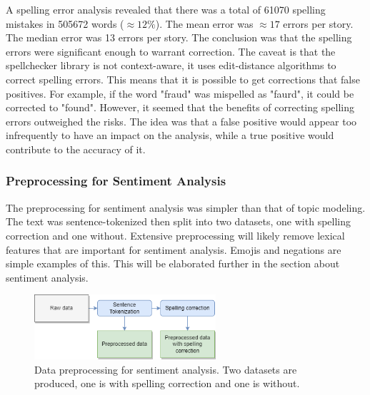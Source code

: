 A spelling error analysis revealed that there was a total of 61070 spelling mistakes in 505672 words ($\approx 12\%$). The mean error was $\approx17$ errors per story. The median error was 13 errors per story. The conclusion was that the spelling errors were significant enough to warrant correction. The caveat is that the spellchecker library is not context-aware, it uses edit-distance algorithms to correct spelling errors. This means that it is possible to get corrections that false positives. For example, if the word "fraud" was mispelled as "faurd", it could be corrected to "found". However, it seemed that the benefits of correcting spelling errors outweighed the risks. The idea was that a false positive would appear too infrequently to have an impact on the analysis, while a true positive would contribute to the accuracy of it.

\subsubsection*{Preprocessing for Sentiment Analysis}

The preprocessing for sentiment analysis was simpler than that of topic modeling. The text was sentence-tokenized then split into two datasets, one with spelling correction and one without. Extensive preprocessing will likely remove lexical features that are important for sentiment analysis. Emojis and negations are simple examples of this. This will be elaborated further in the section about sentiment analysis.

\begin{figure}[h]
    \centering
    \includegraphics[width=0.6\textwidth]{resources/preprocessing_sentiment_analysis.png}
    \caption{Data preprocessing for sentiment analysis. Two datasets are produced, one is with spelling correction and one is without.}
    \label{fig:preprocessing_sentiment_analysis}
\end{figure}